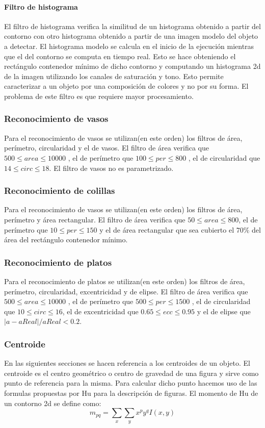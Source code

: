 	\paragraph{Filtro de histograma}
	El filtro de histograma verifica la similitud de un histograma obtenido a partir del contorno con otro histograma obtenido a partir de 
	una imagen modelo del objeto a detectar. El histograma modelo se calcula en el inicio de la ejecución mientras que el del contorno se
	computa en tiempo real. Esto se hace obteniendo el rectángulo contenedor mínimo de dicho contorno y computando un histograma 2d de la imagen
	utilizando los canales de saturación y tono. Esto permite caracterizar a un objeto por una composición de colores y no por su forma. El 
	problema de este filtro es que requiere mayor procesamiento.
	
	\subsubsection{Reconocimiento de vasos}
	Para el reconocimiento de vasos se utilizan(en este orden) los filtros de área, perímetro, circularidad y el de vasos.
	El filtro de área verifica que $500 \leq area \leq 10000 $ , el de perímetro que $100 \leq per \leq 800 $ , el de circularidad
	que $14 \leq circ \leq 18$. El filtro de vasos no es parametrizado. 
	
	\subsubsection{Reconocimiento de colillas}
	Para el reconocimiento de vasos se utilizan(en este orden) los filtros de área, perímetro y área rectangular.
	El filtro de área verifica que $50 \leq area \leq 800 $, el de perímetro que $10 \leq per \leq 150 $ y el de área rectangular
	que sea cubierto el $70\%$ del área del rectángulo contenedor mínimo.
	
	\subsubsection{Reconocimiento de platos}
	Para el reconocimiento de platos se utilizan(en este orden) los filtros de área, perímetro, circularidad, excentricidad y de elipse.
	El filtro de área verifica que $500 \leq area \leq 10000 $ , el de perímetro que $500 \leq per \leq 1500 $ , el de circularidad
	que $10 \leq circ \leq 16$, el de excentricidad que $0.65 \leq ecc \leq 0.95$ y el de elipse que $|a-aReal|/ aReal < 0.2$.
	
	\subsubsection{Centroide}
	En las siguientes secciones se hacen referencia a los centroides 
	de un objeto. El centroide es el centro geométrico o centro de 
	gravedad de una figura y 
	sirve como punto de referencia para la misma. Para calcular dicho 
	punto hacemos uso de las formulas propuestas por Hu \cite{Hu1962} para la 
	descripción de figuras. El momento de Hu de un contorno 2d se define como:
	\begin{equation}
		m_{pq}=\sum_{x}{\sum_{y}{x^py^qI(x,y)}}
	\end{equation}
	
